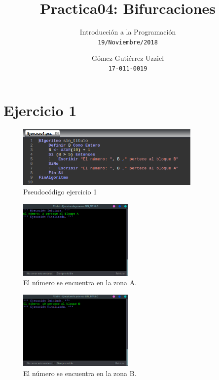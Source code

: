 \documentclass[11pt, a4paper]{report}
\begin{document}
\title{Practica04: Bifurcaciones}
\author{
  Introducci\'on a la Programaci\'on\\
  \texttt{19/Noviembre/2018}
  \and
  G\'omez Guti\'errez Uzziel\\
  \texttt{17-011-0019}
}
\date{}
\maketitle

\section*{Ejercicio 1}

\begin{figure}[!ht]
\begin{center}
  \includegraphics[width=0.8\textwidth]{ejercicio1.png}
  \caption{Pseudoc\'odigo ejercicio 1}
\end{center}
\end{figure}

\begin{figure}[!ht]
\begin{center}
  \includegraphics[width=0.5\textwidth]{respuesta1.png}
  \caption{El n\'umero se encuentra en la zona A.}
\end{center}
\end{figure}

\begin{figure}[!ht]
\begin{center}
  \includegraphics[width=0.5\textwidth]{respuesta2.png}
  \caption{El n\'umero se encuentra en la zona B.}
\end{center}
\end{figure}
 	
\end{document}
